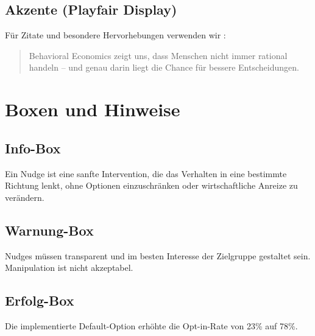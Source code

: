 \documentclass{fehradvice-report}
\begin{document}
\subsection{Akzente (Playfair Display)}

Für Zitate und besondere Hervorhebungen verwenden wir :

\begin{quote}
Behavioral Economics zeigt uns, dass Menschen nicht immer rational handeln -- und genau darin liegt die Chance für bessere Entscheidungen.
\end{quote}

\section{Boxen und Hinweise}

\subsection{Info-Box}

\begin{fainfobox}
Ein Nudge ist eine sanfte Intervention, die das Verhalten in eine bestimmte Richtung lenkt, ohne Optionen einzuschränken oder wirtschaftliche Anreize zu verändern.
\end{fainfobox}

\subsection{Warnung-Box}

\begin{fawarningbox}
Nudges müssen transparent und im besten Interesse der Zielgruppe gestaltet sein. Manipulation ist nicht akzeptabel.
\end{fawarningbox}

\subsection{Erfolg-Box}

\begin{fasuccessbox}
Die implementierte Default-Option erhöhte die Opt-in-Rate von 23\% auf 78\%.
\end{fasuccessbox}
\end{document}
